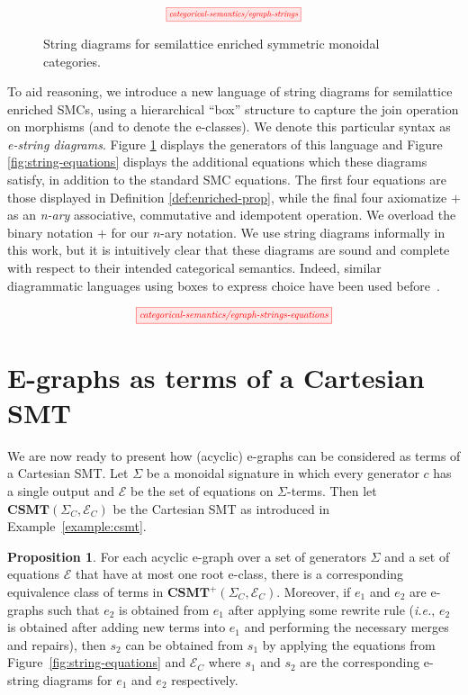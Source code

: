 \documentclass[sigconf, 9pt, nonacm]{acmart}
\theoremstyle{definition}
\newtheorem{proposition}[thm]{Proposition}
\begin{document}
\begin{figure}
    \[
        \scalebox{0.65}{
        \tikzfig{categorical-semantics/egraph-strings}
        }
    \]
    \captionsetup{belowskip=-5ex}
    \caption{String diagrams for semilattice enriched symmetric monoidal categories.}
    \label{fig:egraph-strings}
    \end{figure}
    

To aid reasoning, we introduce a new language of string diagrams for semilattice enriched SMCs, using a hierarchical ``box'' structure to capture the join operation on morphisms (and to denote the e-classes).
We denote this particular syntax as \textit{e-string diagrams}.
Figure \ref{fig:egraph-strings} displays the generators of this language and Figure \ref{fig:string-equations} displays the additional equations which these diagrams satisfy, in addition to the standard SMC equations. 
The first four equations are those displayed in Definition \ref{def:enriched-prop},  while the final four axiomatize $+$ as an \textit{n-ary} associative, commutative and idempotent operation.  We overload the binary notation $+$ for our $n$-ary notation.  
We use string diagrams informally in this work, but it is intuitively clear that these diagrams are sound and complete with respect to their intended categorical semantics. 
Indeed, similar diagrammatic languages using boxes to express choice have been used before~\cite{duncan_generalised_2009}. 

\begin{figure*}
\[  
    \scalebox{0.75}{
	\tikzfig{categorical-semantics/egraph-strings-equations}
    }
\]
\caption{Equations for a  semilattice enriched symmetric monoidal category}
\label{fig:string-equations}
\end{figure*}

\section{E-graphs as terms of a Cartesian SMT}
We are now ready to present how (acyclic) e-graphs can be considered as terms of a Cartesian SMT.
Let $\Sigma$ be a monoidal signature in which every generator $c$ has a single output and $\mathcal{E}$ be the set of equations on $\Sigma$-terms. 
Then let $\textbf{CSMT}(\Sigma_{C},\mathcal{E}_{C})$ be the Cartesian SMT as introduced in Example~\ref{example:csmt}.
\begin{proposition}
    For each acyclic e-graph over a set of generators $\Sigma$ and a set of equations $\mathcal{E}$ that have at most one root e-class, there is a corresponding equivalence class of terms in $\textbf{CSMT}^{+}(\Sigma_{C},\mathcal{E}_{C})$.
    Moreover, if $e_1$ and $e_2$ are e-graphs such that $e_2$ is obtained from $e_1$ after applying some rewrite rule (\textit{i.e.}, $e_2$ is obtained after adding new terms into $e_1$ and performing the necessary merges and repairs), then $s_2$ can be obtained from $s_1$ by applying the equations from Figure~\ref{fig:string-equations} and $\mathcal{E}_{C}$ where $s_1$ and $s_2$ are the corresponding e-string diagrams for $e_1$ and $e_2$ respectively.
\end{proposition}
\end{document}

